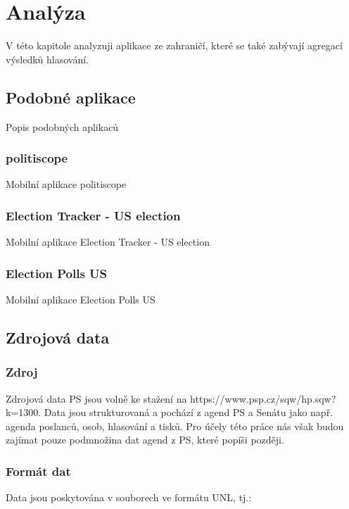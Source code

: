 \chapter{Analýza}

\setcounter{page}{1}

\begin{chapterabstract}
	V této kapitole analyzuji aplikace ze zahraničí, které se také zabývají agregací výsledků hlasování.
\end{chapterabstract}

\section{Podobné aplikace}
Popis podobných aplikaců

\subsection{politiscope}
Mobilní aplikace politiscope

\subsection{Election Tracker - US election}
Mobilní aplikace Election Tracker - US election

\subsection{Election Polls US}
Mobilní aplikace Election Polls US

\section{Zdrojová data}

\subsection{Zdroj}

Zdrojová data PS jsou volně ke stažení na https://www.psp.cz/sqw/hp.sqw?k=1300. Data jsou strukturovaná a pochází z agend PS a Senátu jako např. agenda poslanců, osob, hlasování a tisků. Pro účely této práce nás však budou zajímat pouze podmnožina dat agend z PS, které popíši později. 

\subsection{Formát dat}
Data jsou poskytována v souborech ve formátu UNL, tj.:

